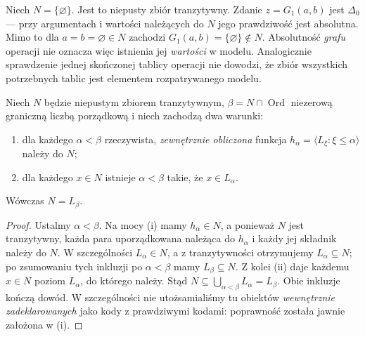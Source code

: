 \begin{przyklad}
\label{ex:l-delta0-not-closure-2026}
Niech $N=\{\varnothing\}$. Jest to niepusty zbiór
tranzytywny. Zdanie $z=G_1(a,b)$ jest $\Delta_0$
— przy argumentach i wartości należących do $N$
jego prawdziwość jest absolutna. Mimo to dla
$a=b=\varnothing\in N$ zachodzi
$G_1(a,b)=\{\varnothing\}\notin N$.
Absolutność \emph{grafu} operacji nie oznacza więc
istnienia jej \emph{wartości} w modelu.
Analogicznie sprawdzenie jednej skończonej tablicy
operacji nie dowodzi, że zbiór wszystkich potrzebnych
tablic jest elementem rozpatrywanego modelu.
\end{przyklad}

\begin{lemat}
\label{lem:l-external-codes-identify-2026}
Niech $N$ będzie niepustym zbiorem tranzytywnym,
$\beta=N\cap\operatorname{Ord}$ niezerową graniczną
liczbą porządkową i niech zachodzą dwa warunki:
\begin{enumerate}[label=(\roman*)]
\item dla każdego $\alpha<\beta$ rzeczywista,
  \emph{zewnętrznie obliczona} funkcja
  $h_\alpha=\langle L_\xi:\xi\leq\alpha\rangle$
  należy do $N$;
\item dla każdego $x\in N$ istnieje
  $\alpha<\beta$ takie, że $x\in L_\alpha$.
\end{enumerate}
Wówczas $N=L_\beta$.
\end{lemat}
\begin{proof}
Ustalmy $\alpha<\beta$. Na mocy (i) mamy
$h_\alpha\in N$, a ponieważ $N$ jest tranzytywny,
każda para uporządkowana należąca do $h_\alpha$
i każdy jej składnik należy do $N$. W szczególności
$L_\alpha\in N$, a z tranzytywności otrzymujemy
$L_\alpha\subseteq N$; po zsumowaniu tych
inkluzji po $\alpha<\beta$ mamy
$L_\beta\subseteq N$.
Z kolei (ii) daje każdemu $x\in N$ poziom
$L_\alpha$, do którego należy. Stąd
$N\subseteq\bigcup_{\alpha<\beta}L_\alpha=L_\beta$.
Obie inkluzje kończą dowód. W szczególności nie
utożsamialiśmy tu obiektów \emph{wewnętrznie
zadeklarowanych} jako kody z prawdziwymi kodami:
poprawność została jawnie założona w (i).
\end{proof}

